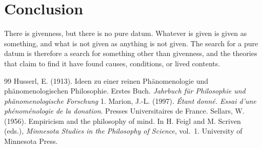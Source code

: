 \documentclass{situationist-preprint}
\begin{document}
\section{Conclusion}

There is givenness, but there is no pure datum. Whatever is given is given as something, and what is not given as anything is not given. The search for a pure datum is therefore a search for something other than givenness, and the theories that claim to find it have found causes, conditions, or lived contents.

\begin{thebibliography}{99}\small
{} Husserl, E. (1913). Ideen zu einer reinen Phänomenologie und phänomenologischen Philosophie. Erstes Buch. \emph{Jahrbuch für Philosophie und phänomenologische Forschung} 1.
 Marion, J.-L. (1997). \emph{Étant donné. Essai d'une phénoménologie de la donation}. Presses Universitaires de France.
 Sellars, W. (1956). Empiricism and the philosophy of mind. In H. Feigl and M. Scriven (eds.), \emph{Minnesota Studies in the Philosophy of Science}, vol.~1. University of Minnesota Press.
\end{thebibliography}
\end{document}
